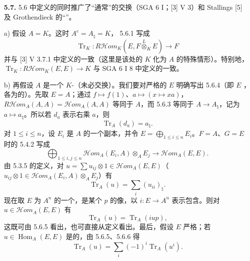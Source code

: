 \textbf{5.7.} 5.6 中定义的同时推广了“通常”的交换（SGA 6 I；[3] V 3）和 Stallings [5] 及 Grothendieck 的“”。

a) 假设 $A=K$。这时 $A^e=A_\natural=K$， 5.6.1 写成
\[\operatorname{Tr}_K:R\mathcal{H}\!om_K(E,F\overset L\otimes_K E)\longrightarrow F\]
并与 [3] V 3.7.1 中定义的一致（这里是该处的 $K$ 化为 $A$ 的特殊情形）。特别地，$\operatorname{Tr}_K:R\mathcal{H}\!om_K(E,E)\to K$ 与 SGA 6 I 8 中定义的一致。

b) 再假设 $A$ 是一个 $K$-（未必交换）。我们要对严格的 $E$ 明确写出 5.6.4（即 $E$ ，各为的）。先取 $E=A$；通过 $f\mapsto f(1)$、$a\mapsto(x\mapsto xa)$，$R\mathcal{H}\!om_A(A,A)=\mathcal{H}\!om_A(A,A)$ 等同于 $A$，而 5.6.3 等同于 $A\to A_\natural$，记为 $a\mapsto a_\natural$。所以若 $d_a$ 表示右乘 $a$，则
\begin{equation}\operatorname{Tr}_A(d_a)=a_\natural.\tag{5.7.1}\end{equation}
对 $1\leq i\leq n$，设 $E_i$ 是 $A$ 的一个副本，并令 $E=\bigoplus_{1\leq i\leq n}E_i$。$F=A$、$G=E$ 时的 5.4.2 写成
\[\bigoplus_{1\leq i,j\leq n}\mathcal{H}\!om_A(E_i,A)\otimes_A E_j\longrightarrow\mathcal{H}\!om_A(E,E).\]
由 5.3.5 的定义，对 $u=\sum u_{ij}\otimes1\in\mathcal{H}\!om_A(E,E)$（$u_{ij}\otimes1\in\mathcal{H}\!om_A(E_i,A)\otimes_A E_j$）有
\begin{equation}\operatorname{Tr}_A(u)=\sum_i(u_{ii})_\natural.\tag{5.7.2}\end{equation}
现在取 $E$ 为 $A^n$ 的一个，是某个 $p$ 的像，以 $i:E\to A^n$ 表示包含。则对 $u\in\mathcal{H}\!om_A(E,E)$ 有
\begin{equation}\operatorname{Tr}_A(u)=\operatorname{Tr}_A(iup),\tag{5.7.3}\end{equation}
这既可由 5.6.5 看出，也可直接从定义看出。最后，假设 $E$ 严格；若 $u\in\operatorname{Hom}_A(E,E)$ 是的，由 5.6.5、5.6.6 得
\begin{equation}\operatorname{Tr}_A(u)=\sum_i(-1)^i\operatorname{Tr}_A(u^i).\tag{5.7.4}\end{equation}
